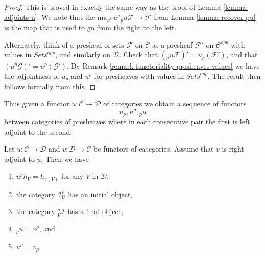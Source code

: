 \begin{proof}
This is proved in exactly the same way as the proof
of Lemma \ref{lemma-adjoints-u}. We note that the map
$u^p{}_pu \mathcal{F} \to \mathcal{F}$ from
Lemma \ref{lemma-recover-pu} is the map that
is used to go from the right to the left.

\medskip\noindent
Alternately, think
of a presheaf of sets $\mathcal{F}$ on $\mathcal{C}$ as a presheaf
$\mathcal{F}'$ on $\mathcal{C}^{opp}$ with values in $\textit{Sets}^{opp}$,
and similarly on $\mathcal{D}$.
Check that $({}_pu \mathcal{F})' = u_p(\mathcal{F}')$,
and that $(u^p\mathcal{G})' = u^p(\mathcal{G}')$.
By Remark \ref{remark-functoriality-presheaves-values}
we have the adjointness of $u_p$ and $u^p$ for
presheaves with values in $\textit{Sets}^{opp}$.
The result then follows formally from this.
\end{proof}

\noindent
Thus given a functor $u : \mathcal{C} \to \mathcal{D}$ of categories
we obtain a sequence of functors
$$
u_p, u^p, {}_pu
$$
between categories of presheaves where in each consecutive pair the
first is left adjoint to the second.

\begin{lemma}
\label{lemma-adjoint-functors}
Let $u : \mathcal{C} \to \mathcal{D}$ and $v : \mathcal{D} \to \mathcal{C}$
be functors of categories. Assume that $v$ is right adjoint to $u$.
Then we have
\begin{enumerate}
\item $u^ph_V = h_{v(V)}$ for any $V$ in $\mathcal{D}$,
\item the category $\mathcal{I}^v_U$ has an initial object,
\item the category ${}_V^u\mathcal{I}$ has a final object,
\item ${}_pu = v^p$, and
\item $u^p = v_p$.
\end{enumerate}
\end{lemma}

